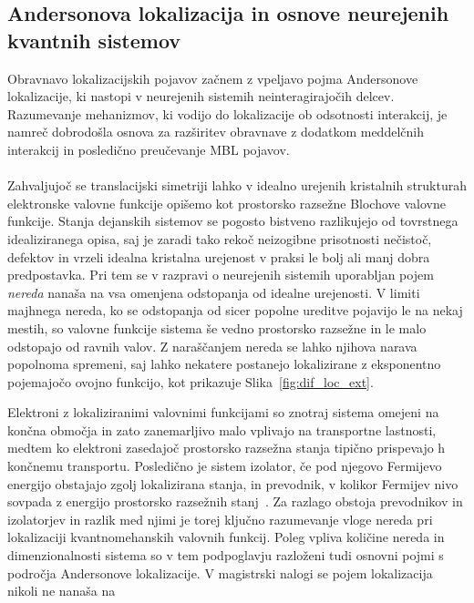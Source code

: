 \documentclass[10pt,a4paper]{article}
\begin{document}
\subsection{Andersonova lokalizacija in osnove neurejenih kvantnih sistemov}\label{anderson}
Obravnavo lokalizacijskih pojavov začnem z vpeljavo pojma Andersonove lokalizacije, ki nastopi v neurejenih sistemih neinteragirajočih delcev. Razumevanje mehanizmov, ki vodijo do lokalizacije ob odsotnosti interakcij, je namreč dobrodošla osnova za razširitev obravnave z dodatkom meddelčnih interakcij in posledično preučevanje MBL pojavov. \\\\	
Zahvaljujoč se translacijski simetriji lahko v idealno urejenih kristalnih strukturah elektronske valovne funkcije  opišemo kot prostorsko razsežne Blochove valovne funkcije. Stanja dejanskih sistemov se pogosto bistveno razlikujejo od tovrstnega idealiziranega opisa, saj je zaradi tako rekoč neizogibne prisotnosti nečistoč, defektov in vrzeli idealna kristalna urejenost v praksi le bolj ali manj dobra predpostavka. Pri tem se v razpravi o neurejenih sistemih uporabljan pojem \emph{nereda} nanaša na vsa omenjena odstopanja od idealne urejenosti.  V limiti majhnega nereda, ko se odstopanja od sicer popolne ureditve pojavijo le na nekaj mestih, so valovne funkcije sistema še vedno prostorsko razsežne in le malo odstopajo od ravnih valov. Z naraščanjem nereda se lahko njihova narava popolnoma spremeni, saj lahko nekatere  postanejo lokalizirane z eksponentno pojemajočo ovojno funkcijo, kot prikazuje Slika~\ref{fig:dif_loc_ext}.
\begin{minipage}[t]{0.57\textwidth}
\noindent 
 Elektroni z lokaliziranimi valovnimi funkcijami so znotraj sistema omejeni na končna območja in zato zanemarljivo malo vplivajo na transportne lastnosti, medtem ko elektroni zasedajoč prostorsko razsežna stanja tipično prispevajo h končnemu transportu. Posledično je sistem izolator, če pod njegovo Fermijevo energijo obstajajo zgolj lokalizirana stanja, in prevodnik, v kolikor Fermijev nivo sovpada z energijo prostorsko razsežnih stanj~\cite{kramer1993localization}. Za razlago obstoja prevodnikov in izolatorjev in razlik med njimi je torej ključno razumevanje vloge nereda pri lokalizaciji kvantnomehanskih valovnih funkcij. Poleg vpliva količine nereda in dimenzionalnosti sistema so v tem podpoglavju razloženi tudi osnovni pojmi s področja Andersonove lokalizacije. V magistrski nalogi se pojem lokalizacija nikoli ne nanaša na
\end{minipage}\hfill
\end{document}
